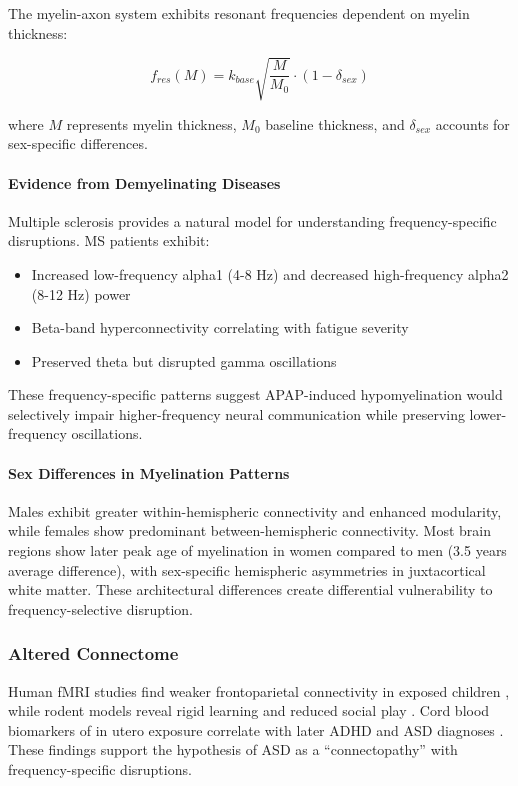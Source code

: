 \documentclass[12pt]{article}
\begin{document}
The myelin-axon system exhibits resonant frequencies dependent on myelin thickness:

\begin{equation}
f_{res}(M) = k_{base} \sqrt{\frac{M}{M_0}} \cdot \left(1 - \delta_{sex}\right)
\end{equation}

where $M$ represents myelin thickness, $M_0$ baseline thickness, and $\delta_{sex}$ accounts for sex-specific differences.

\paragraph{Evidence from Demyelinating Diseases}
Multiple sclerosis provides a natural model for understanding frequency-specific disruptions. MS patients exhibit:
\begin{itemize}
\item Increased low-frequency alpha1 (4-8 Hz) and decreased high-frequency alpha2 (8-12 Hz) power
\item Beta-band hyperconnectivity correlating with fatigue severity  
\item Preserved theta but disrupted gamma oscillations
\end{itemize}

These frequency-specific patterns suggest APAP-induced hypomyelination would selectively impair higher-frequency neural communication while preserving lower-frequency oscillations.

\paragraph{Sex Differences in Myelination Patterns}
Males exhibit greater within-hemispheric connectivity and enhanced modularity, while females show predominant between-hemispheric connectivity. Most brain regions show later peak age of myelination in women compared to men (3.5 years average difference), with sex-specific hemispheric asymmetries in juxtacortical white matter. These architectural differences create differential vulnerability to frequency-selective disruption.

\subsubsection{Altered Connectome}
Human fMRI studies find weaker frontoparietal connectivity in exposed children \citep{baker2020}, while rodent models reveal rigid learning and reduced social play \citep{blecharz2018,viberg2014}. Cord blood biomarkers of in utero exposure correlate with later ADHD and ASD diagnoses \citep{ji2020}. These findings support the hypothesis of ASD as a ``connectopathy'' with frequency-specific disruptions.
\end{document}

